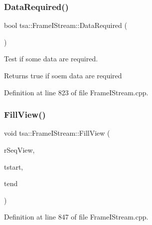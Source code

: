 \mbox{\label{classtsa_1_1_frame_i_stream_af13e8a06bafa6e63bde6871d763425f1}} 
\subsubsection{\texorpdfstring{Data\+Required()}{DataRequired()}}
{\footnotesize\ttfamily bool tsa\+::\+Frame\+I\+Stream\+::\+Data\+Required (\begin{DoxyParamCaption}{ }\end{DoxyParamCaption})\hspace{0.3cm}{\ttfamily [private]}}

Test if some data are required.

\begin{DoxyReturn}{Returns}
true if soem data are required 
\end{DoxyReturn}


Definition at line 823 of file Frame\+I\+Stream.\+cpp.

\mbox{\label{classtsa_1_1_frame_i_stream_a66b4e5b136f07fc3044865908364c913}} 
\subsubsection{\texorpdfstring{Fill\+View()}{FillView()}}
{\footnotesize\ttfamily void tsa\+::\+Frame\+I\+Stream\+::\+Fill\+View (\begin{DoxyParamCaption}\item[{\hyperlink{namespacetsa_ac599574bcc094eda25613724b8f3ca9e}{Seq\+View\+Double} \&}]{r\+Seq\+View,  }\item[{double}]{tstart,  }\item[{double}]{tend }\end{DoxyParamCaption})}



Definition at line 847 of file Frame\+I\+Stream.\+cpp.

\mbox{\label{classtsa_1_1_frame_i_stream_a0f65554481bf64cab44c7f5cbddb1987}} 
